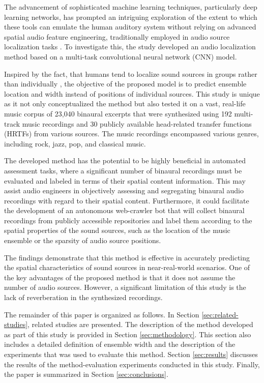 \documentclass{article}
\begin{document}
The advancement of sophisticated machine learning techniques, particularly deep learning networks, has prompted an intriguing exploration of the extent to which these tools can emulate the human auditory system without relying on advanced spatial audio feature engineering, traditionally employed in audio source localization tasks \cite{yang_deepear_2022, vera-diaz_towards_2018, pang_multitask_2019}. To investigate this, the study developed an audio localization method based on a multi-task convolutional neural network (CNN) model. 

Inspired by the fact, that humans tend to localize sound sources in groups rather than individually \cite{bregman_auditory_1990, rumsey_spatial_2002}, the objective of the proposed model is to predict ensemble location and width instead of positions of individual sources. This study is unique as it not only conceptualized the method but also tested it on a vast, real-life music corpus of 23,040 binaural excerpts that were synthesized using 192 multi-track music recordings and 30 publicly available head-related transfer functions (HRTFs) from various sources. The music recordings encompassed various genres, including rock, jazz, pop, and classical music. 

The developed method has the potential to be highly beneficial in automated assessment tasks, where a significant number of binaural recordings must be evaluated and labeled in terms of their spatial content information. This may assist audio engineers in objectively assessing and segregating binaural audio recordings with regard to their spatial content. Furthermore, it could facilitate the development of an autonomous web-crawler bot that will collect binaural recordings from publicly accessible repositories and label them according to the spatial properties of the sound sources, such as the location of the music ensemble or the sparsity of audio source positions. 

The findings demonstrate that this method is effective in accurately predicting the spatial characteristics of sound sources in near-real-world scenarios. One of the key advantages of the proposed method is that it does not assume the number of audio sources. However, a significant limitation of this study is the lack of reverberation in the synthesized recordings.

The remainder of this paper is organized as follows. In Section \ref{sec:related-studies}, related studies are presented. The description of the method developed as part of this study is provided in Section \ref{sec:methodology}. This section also includes a detailed definition of ensemble width and the description of the experiments that was used to evaluate this method. Section \ref{sec:results} discusses the results of the method-evaluation experiments conducted in this study. Finally, the paper is summarized in Section \ref{sec:conclusions}.
\end{document}
